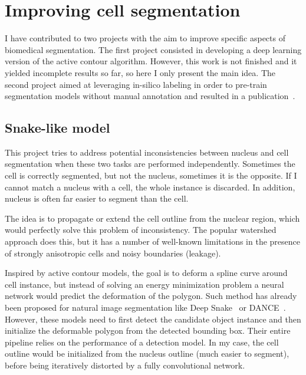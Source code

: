 
\section{Improving cell segmentation}
\label{sec:segmentation_improvements}

I have contributed to two projects with the aim to improve specific aspects of biomedical segmentation.
The first project consisted in developing a deep learning version of the active contour algorithm.
However, this work is not finished and it yielded incomplete results so far, so here I only present the main idea.
The second project aimed at leveraging in-silico labeling in order to pre-train segmentation models without manual annotation and resulted in a publication~\cite{Bonte_2022}.

\subsection{Snake-like model}
\label{subsec:segmentation_snake}

This project tries to address potential inconsistencies between nucleus and cell segmentation when these two tasks are performed independently.
Sometimes the cell is correctly segmented, but not the nucleus, sometimes it is the opposite.
If I cannot match a nucleus with a cell, the whole instance is discarded.
In addition, nucleus is often far easier to segment than the cell.

The idea is to propagate or extend the cell outline from the nuclear region, which would perfectly solve this problem of inconsistency.
The popular watershed approach does this, but it has a number of well-known limitations in the presence of strongly anisotropic cells and noisy boundaries (leakage). 


Inspired by active contour models, the goal is to deform a spline curve around cell instance, but instead of solving an energy minimization problem a neural network would predict the deformation of the polygon.
Such method has already been proposed for natural image segmentation like Deep Snake~\cite{Peng_2020_CVPR} or DANCE~\cite{Liu_2021}.
However, these models need to first detect the candidate object instance and then initialize the deformable polygon from the detected bounding box.
Their entire pipeline relies on the performance of a detection model.
In my case, the cell outline would be initialized from the nucleus outline (much easier to segment), before being iteratively distorted by a fully convolutional network.

